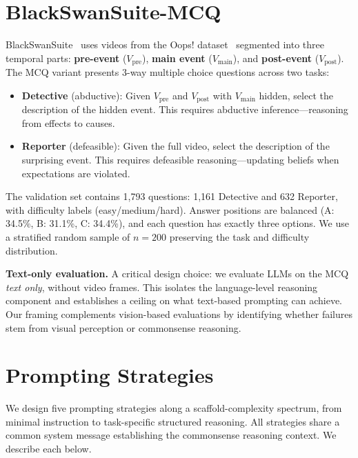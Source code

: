\documentclass[10pt,twocolumn,letterpaper]{article}
\begin{document}
\section{BlackSwanSuite-MCQ}
\label{sec:dataset}

BlackSwanSuite~\cite{chinchure2025black} uses videos from the Oops! dataset~\cite{epstein2020oops} segmented into three temporal parts: \textbf{pre-event} ($V_\text{pre}$), \textbf{main event} ($V_\text{main}$), and \textbf{post-event} ($V_\text{post}$). The MCQ variant presents 3-way multiple choice questions across two tasks:

\begin{itemize}[nosep,leftmargin=*]
\item \textbf{Detective} (abductive): Given $V_\text{pre}$ and $V_\text{post}$ with $V_\text{main}$ hidden, select the description of the hidden event. This requires abductive inference---reasoning from effects to causes.
\item \textbf{Reporter} (defeasible): Given the full video, select the description of the surprising event. This requires defeasible reasoning---updating beliefs when expectations are violated.
\end{itemize}

The validation set contains 1{,}793 questions: 1{,}161 Detective and 632 Reporter, with difficulty labels (easy/medium/hard). Answer positions are balanced (A: 34.5\%, B: 31.1\%, C: 34.4\%), and each question has exactly three options. We use a stratified random sample of $n=200$ preserving the task and difficulty distribution.

\textbf{Text-only evaluation.} A critical design choice: we evaluate LLMs on the MCQ \textit{text only}, without video frames. This isolates the language-level reasoning component and establishes a ceiling on what text-based prompting can achieve. Our framing complements vision-based evaluations by identifying whether failures stem from visual perception or commonsense reasoning.

\section{Prompting Strategies}
\label{sec:methods}

We design five prompting strategies along a scaffold-complexity spectrum, from minimal instruction to task-specific structured reasoning. All strategies share a common system message establishing the commonsense reasoning context. We describe each below.
\end{document}
